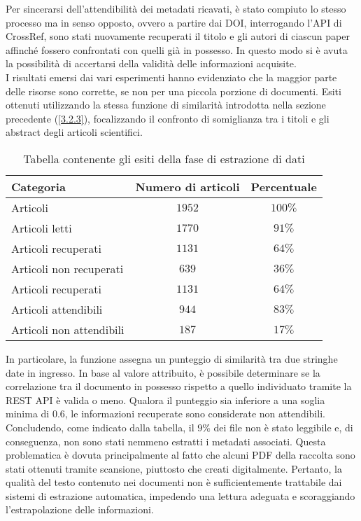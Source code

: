 Per sincerarsi dell'attendibilità dei metadati ricavati, è stato compiuto lo stesso processo ma in senso opposto, ovvero a partire dai DOI, interrogando l'API di CrossRef, sono stati nuovamente recuperati il titolo e gli autori di ciascun paper affinché fossero confrontati con quelli già in possesso. In questo modo si è avuta la possibilità di accertarsi della validità delle informazioni acquisite. \vspace{7pt} \\
I risultati emersi dai vari esperimenti hanno evidenziato che la maggior parte delle risorse sono corrette, se non per una piccola porzione di documenti. Esiti ottenuti utilizzando la stessa funzione di similarità introdotta nella sezione precedente (\ref{3.2.3}), focalizzando il confronto di somiglianza tra i titoli e gli abstract degli articoli scientifici.
\begin{table}[H]
    \centering
    \begin{tabular}{lcc}
        \toprule
        \textbf{Categoria} & \textbf{Numero di articoli} & \textbf{Percentuale} \\
        \midrule
        Articoli & $1952$ & $100\%$ \\
        \hline
        Articoli letti & $1770$ & $91\%$ \\
        \hline
        Articoli recuperati & $1131$ & $64\%$ \\
        Articoli non recuperati & $639$ & $36\%$ \\
        \hline
        Articoli recuperati & $1131$ & $64\%$ \\
        \hline
        Articoli attendibili & $944$ & $83\%$ \\
        Articoli non attendibili & $187$ & $17\%$ \\
        \bottomrule
    \end{tabular}
    \caption{Tabella contenente gli esiti della fase di estrazione di dati}
\end{table}
In particolare, la funzione assegna un punteggio di similarità tra due stringhe date in ingresso. In base al valore attribuito, è possibile determinare se la correlazione tra il documento in possesso rispetto a quello individuato tramite la REST API è valida o meno. Qualora il punteggio sia inferiore a una soglia minima di $0.6$, le informazioni recuperate sono considerate non attendibili. \vspace{7pt} \\
Concludendo, come indicato dalla tabella, il $9\%$ dei file non è stato leggibile e, di conseguenza, non sono stati nemmeno estratti i metadati associati. Questa problematica è dovuta principalmente al fatto che alcuni PDF della raccolta sono stati ottenuti tramite scansione, piuttosto che creati digitalmente. Pertanto, la qualità del testo contenuto nei documenti non è sufficientemente trattabile dai sistemi di estrazione automatica, impedendo una lettura adeguata e scoraggiando l'estrapolazione delle informazioni.  